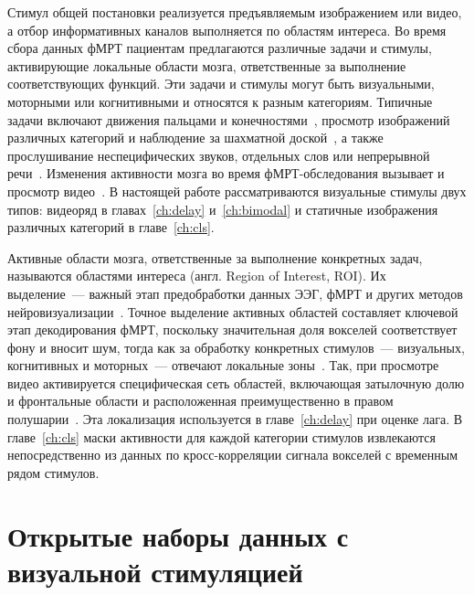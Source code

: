 Стимул общей постановки реализуется предъявляемым изображением или видео, а отбор информативных каналов выполняется по областям интереса. Во время сбора данных фМРТ пациентам предлагаются различные задачи и стимулы, активирующие локальные области мозга, ответственные за выполнение соответствующих функций. Эти задачи и стимулы могут быть визуальными, моторными или когнитивными и относятся к разным категориям. Типичные задачи включают движения пальцами и конечностями~\cite{VARONE2024102006, Roux1998, Papke1999}, просмотр изображений различных категорий и наблюдение за шахматной доской~\cite{Engel1994, Schneider1994}, а также прослушивание неспецифических звуков, отдельных слов или непрерывной речи~\cite{Binder1994, Dymarkowski1998}. Изменения активности мозга во время фМРТ-обследования вызывает и просмотр видео~\cite{decety1997brain}. В настоящей работе рассматриваются визуальные стимулы двух типов: видеоряд в главах~\ref{ch:delay} и~\ref{ch:bimodal} и статичные изображения различных категорий в главе~\ref{ch:cls}.

Активные области мозга, ответственные за выполнение конкретных задач, называются областями интереса (англ. Region of Interest, ROI). Их выделение~--- важный этап предобработки данных ЭЭГ, фМРТ и других методов нейровизуализации~\cite{poldrack2007region}. Точное выделение активных областей составляет ключевой этап декодирования фМРТ, поскольку значительная доля вокселей соответствует фону и вносит шум, тогда как за обработку конкретных стимулов~--- визуальных, когнитивных и моторных~--- отвечают локальные зоны~\cite{poldrack2007region, altenmuller2002brain, dorin2024forecasting}. Так, при просмотре видео активируется специфическая сеть областей, включающая затылочную долю и фронтальные области и расположенная преимущественно в правом полушарии~\cite{anderson2006}. Эта локализация используется в главе~\ref{ch:delay} при оценке лага. В главе~\ref{ch:cls} маски активности для каждой категории стимулов извлекаются непосредственно из данных по кросс-корреляции сигнала вокселей с временным рядом стимулов.

\section{Открытые наборы данных с визуальной стимуляцией}\label{sec1:datasets}


